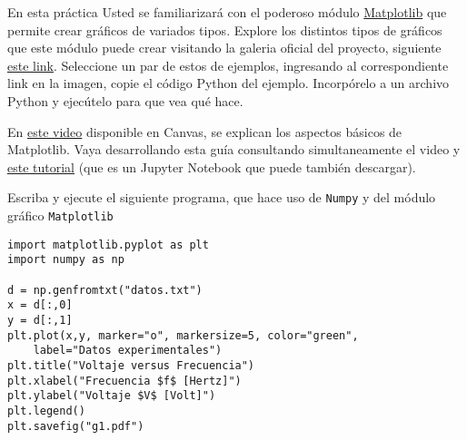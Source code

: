 \documentclass[11pt]{exam}
\begin{document}
\firstpageheadrule
\runningheadrule
{}
\cfoot{ }
\begin{flushleft}
\vspace{0.2in}

\vspace{0.25cm}
\end{flushleft}

\begin{questions}

\item En esta práctica Usted se familiarizará con el poderoso módulo \href{https://matplotlib.org/}{Matplotlib} que permite crear gráficos de variados tipos. Explore los distintos tipos de gráficos que este módulo puede crear visitando la galeria oficial del proyecto, siguiente \href{https://matplotlib.org/stable/gallery/index}{este link}. Seleccione un par de estos de ejemplos, ingresando al correspondiente link en la imagen, copie el código Python del ejemplo. Incorpórelo a un archivo Python y ejecútelo para que vea qué hace.

\item En \href{https://udec.instructure.com/courses/40179/pages/matplotlib?module_item_id=1576193}{este video} disponible en Canvas, se explican los aspectos básicos de Matplotlib. Vaya desarrollando esta guía consultando simultaneamente el video y \href{https://github.com/PythonUdeC/CPC21/blob/main/04-Matplotlib.ipynb}{este tutorial} (que es un Jupyter Notebook que puede también descargar).

\item Escriba y ejecute el siguiente programa, que hace uso de \texttt{Numpy} y del módulo gráfico \texttt{Matplotlib}

\begin{verbatim}
import matplotlib.pyplot as plt
import numpy as np

d = np.genfromtxt("datos.txt")
x = d[:,0]
y = d[:,1]
plt.plot(x,y, marker="o", markersize=5, color="green", 
	label="Datos experimentales")
plt.title("Voltaje versus Frecuencia")
plt.xlabel("Frecuencia $f$ [Hertz]")
plt.ylabel("Voltaje $V$ [Volt]")
plt.legend()
plt.savefig("g1.pdf")
\end{verbatim}


\end{questions}
\end{document}
